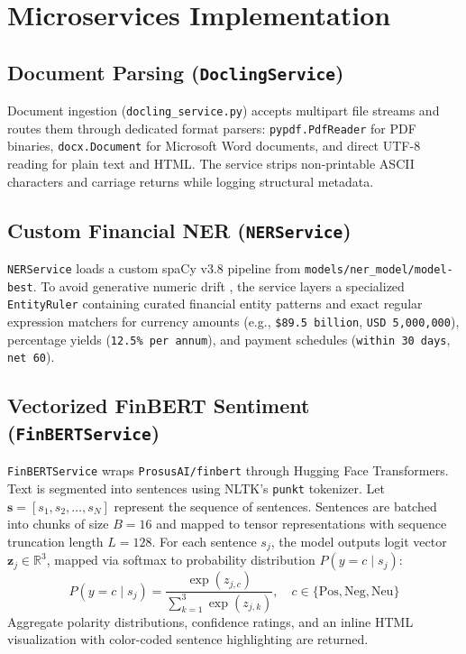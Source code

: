 \documentclass[conference]{IEEEtran}
\begin{document}
\section{Microservices Implementation}

\subsection{Document Parsing (\texttt{DoclingService})}
Document ingestion (\texttt{docling\_service.py}) accepts multipart file streams and routes them through dedicated format parsers: \texttt{pypdf.PdfReader} for PDF binaries, \texttt{docx.Document} for Microsoft Word documents, and direct UTF-8 reading for plain text and HTML. The service strips non-printable ASCII characters and carriage returns while logging structural metadata.

\subsection{Custom Financial NER (\texttt{NERService})}
\texttt{NERService} loads a custom spaCy v3.8 pipeline from \texttt{models/ner\_model/model-best}. To avoid generative numeric drift \cite{b4}, the service layers a specialized \texttt{EntityRuler} containing curated financial entity patterns and exact regular expression matchers for currency amounts (e.g., \texttt{\$89.5 billion}, \texttt{USD 5,000,000}), percentage yields (\texttt{12.5\% per annum}), and payment schedules (\texttt{within 30 days}, \texttt{net 60}).

\subsection{Vectorized FinBERT Sentiment (\texttt{FinBERTService})}
\texttt{FinBERTService} wraps \texttt{ProsusAI/finbert} \cite{b18} through Hugging Face Transformers. Text is segmented into sentences using NLTK's \texttt{punkt} tokenizer. Let $\mathbf{s} = [s_1, s_2, \dots, s_N]$ represent the sequence of sentences. Sentences are batched into chunks of size $B=16$ and mapped to tensor representations with sequence truncation length $L=128$. For each sentence $s_j$, the model outputs logit vector $\mathbf{z}_j \in \mathbb{R}^3$, mapped via softmax to probability distribution $P(y = c \mid s_j)$:
\begin{equation}
P(y = c \mid s_j) = \frac{\exp(z_{j,c})}{\sum_{k=1}^{3} \exp(z_{j,k})}, \quad c \in \{\text{Pos}, \text{Neg}, \text{Neu}\}
\label{eq_softmax}
\end{equation}
Aggregate polarity distributions, confidence ratings, and an inline HTML visualization with color-coded sentence highlighting are returned.
\end{document}

